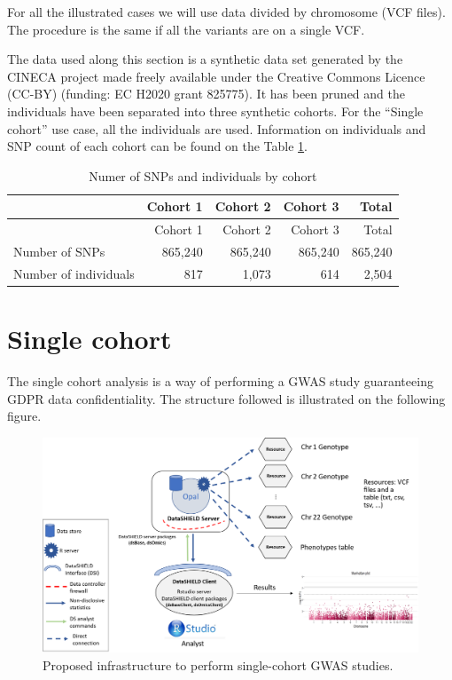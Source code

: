 \documentclass[
]{book}
\begin{document}
For all the illustrated cases we will use data divided by chromosome (VCF files). The procedure is the same if all the variants are on a single VCF.

The data used along this section is a synthetic data set generated by the CINECA project made freely available under the Creative Commons Licence (CC-BY) (funding: EC H2020 grant 825775). It has been pruned and the individuals have been separated into three synthetic cohorts. For the ``Single cohort'' use case, all the individuals are used. Information on individuals and SNP count of each cohort can be found on the Table \ref{tab:tab1}.

\begin{longtable}[]{@{}lrrrr@{}}
\caption{\label{tab:tab1} Numer of SNPs and individuals by cohort}\tabularnewline
\toprule
& Cohort 1 & Cohort 2 & Cohort 3 & Total \\
\midrule
\endfirsthead
\toprule
& Cohort 1 & Cohort 2 & Cohort 3 & Total \\
\midrule
\endhead
Number of SNPs & 865,240 & 865,240 & 865,240 & 865,240 \\
Number of individuals & 817 & 1,073 & 614 & 2,504 \\
\bottomrule
\end{longtable}

\hypertarget{single-cohort}{%
\section{Single cohort}\label{single-cohort}}

The single cohort analysis is a way of performing a GWAS study guaranteeing GDPR data confidentiality. The structure followed is illustrated on the following figure.

\begin{figure}

{\centering \includegraphics[width=25.97in]{fig/single_cohort} 

}

\caption{Proposed infrastructure to perform single-cohort GWAS studies.}\label{fig:singleCohortImage}
\end{figure}
\end{document}
